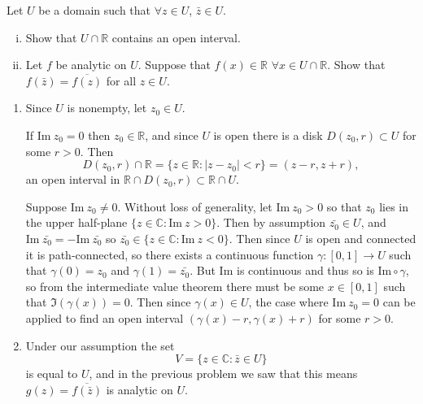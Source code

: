\documentclass{article}
\newcounter{Problem}
\newenvironment{Problem}{\begin{Exercise}[name={Problem},
                                          counter={Problem}]}
                        {\end{Exercise}}
\begin{document}
\begin{Problem}
  Let $U$ be a domain such that $\forall z \in U$, $\bar{z} \in U$.
  \begin{enumerate}[(i)]
    \item{
      Show that $U \cap \mathbb{R}$ contains an open interval.
    }
    \item{
      Let $f$ be analytic on $U$. Suppose that $f(x) \in \mathbb{R}$
      $\forall x \in U \cap \mathbb{R}$. Show that $f(\bar{z}) = \overline{f(z)}$
      for all $z \in U$.
    }
  \end{enumerate}
\end{Problem}

\begin{Answer}
  \begin{enumerate}
    \item{
      Since $U$ is nonempty, let $z_0 \in U$.

      If $\mathrm{Im}~z_0 = 0$
      then $z_0 \in \mathbb{R}$, and since $U$ is open there is a disk
      $D(z_0, r) \subset U$ for some $r > 0$. Then
      $$
        D(z_0, r) \cap \mathbb{R}
      = \{ z \in \mathbb{R} : |z - z_0| < r \}
      = (z-r, z+r),
      $$
      an open interval in
      $\mathbb{R} \cap D(z_0, r) \subset \mathbb{R} \cap U$.

      Suppose $\mathrm{Im}~z_0 \neq 0$. Without loss of generality,
      let $\mathrm{Im}~z_0 > 0$ so that $z_0$ lies in the upper half-plane
      $\{ z \in \mathbb{C} : \mathrm{Im}~z > 0 \}$. Then
      by assumption $\bar{z_0} \in U$, and
      $\mathrm{Im}~\bar{z_0} = -\mathrm{Im}~\bar{z_0}$ so
      $\bar{z_0} \in \{ z \in \mathbb{C} : \mathrm{Im}~z < 0 \}$.
      Then since $U$ is open and connected it is path-connected, so
      there exists a continuous function $\gamma: [0, 1] \to U$ such
      that $\gamma(0) = z_0$ and $\gamma(1) = \bar{z_0}$. But
      $\mathrm{Im}$ is continuous and thus so is
      $\mathrm{Im} \circ \gamma$, so from the intermediate value
      theorem there must be some $x \in [0, 1]$ such that
      $\Im(\gamma(x)) = 0$. Then since $\gamma(x) \in U$, the case
      where $\mathrm{Im}~z_0 = 0$ can be applied to find an open
      interval $(\gamma(x) - r, \gamma(x) + r)$ for some $r > 0$.
    }
    \item{
      Under our assumption the set
      $$
      V = \{ z \in \mathbb{C} : \bar{z} \in U \}
      $$
      is equal to $U$, and in the previous problem we saw that
      this means $g(z) = \overline{f(\bar{z})}$ is analytic on
      $U$.

}
\end{enumerate}
\end{Answer}
\end{document}
